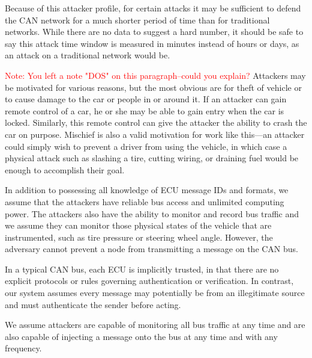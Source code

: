 Because of this attacker profile, for certain attacks it may be sufficient to defend the CAN network for a much shorter period of time than for traditional networks. While there are no data to suggest a hard number, it should be safe to say this attack time window is measured in minutes instead of hours or days, as an attack on a traditional network would be. 



\textcolor{red}{Note: You left a note "DOS" on this paragraph--could you explain?}
Attackers may be motivated for various reasons, but the most obvious are for theft of vehicle or to cause damage to the car or people in or around it. If an attacker can gain remote control of a car, he or she may be able to gain entry when the car is locked. Similarly, this remote control can give the attacker the ability to crash the car on purpose. Mischief is also a valid motivation for work like this---an attacker could simply wish to prevent a driver from using the vehicle, in which case a physical attack such as slashing a tire, cutting wiring, or draining fuel would be enough to accomplish their goal.

In addition to possessing all knowledge of ECU message IDs and formats, we assume that the attackers have reliable bus access and unlimited computing power. The attackers also have the ability to monitor and record bus traffic and we assume they can monitor those physical states of the vehicle that are instrumented, such as tire pressure or steering wheel angle. However, the adversary cannot prevent a node from transmitting a message on the CAN bus.


In a typical CAN bus, each ECU is implicitly trusted, in that there are no explicit protocols or rules governing authentication or verification. In contrast, our system assumes every message may potentially be from an illegitimate source and must authenticate the sender before acting. 

We assume attackers are capable of monitoring all bus traffic at any time and are also capable of injecting a message onto the bus at any time and with any frequency.